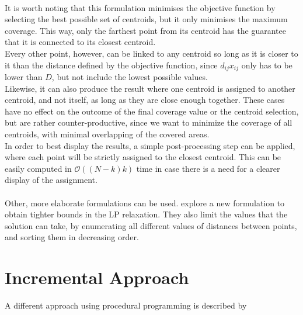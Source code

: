\paragraph{}
It is worth noting that this formulation minimises the objective function by selecting the best possible set of centroids, but it only minimises the maximum coverage. This way, only the farthest point from its centroid has the guarantee that it is connected to its closest centroid.\\
Every other point, however, can be linked to any centroid so long as it is closer to it than the distance defined by the objective function, since $d_{ij}x_{ij}$ only has to be lower than $D$, but not include the lowest possible values.\\
Likewise, it can also produce the result where one centroid is assigned to another centroid, and not itself, as long as they are close enough together.
These cases have no effect on the outcome of the final coverage value or the centroid selection, but are rather counter-productive, since we want to minimize the coverage of all centroids, with minimal overlapping of the covered areas.\\
In order to best display the results, a simple post-processing step can be applied, where each point will be strictly assigned to the closest centroid. This can be easily computed in $\mathcal{O}((N-k)k)$ time in case there is a need for a clearer display of the assignment.

\paragraph{}
Other, more elaborate formulations can be used. \citet{linearprog} explore a new formulation to obtain tighter bounds in the LP relaxation. They also limit the values that the solution can take, by enumerating all different values of distances between points, and sorting them in decreasing order.

\section{Incremental Approach}
A different approach using procedural programming is described by \citet{incrementalcov}
